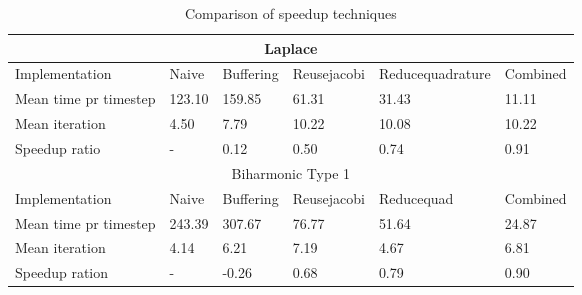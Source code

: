 \begin{table}[h!]
\centering
\caption{Comparison of speedup techniques}
\label{my-label}
\begin{tabular}{ |p{2.8cm}|p{2.2cm}|p{2.4cm}|p{2.4cm}|p{2.4cm}|p{2.4cm}| }
 \hline
  \multicolumn{6}{|c|}{Laplace} \\
 \hline
Implementation & Naive&Buffering&Reusejacobi&Reducequadrature&Combined \\
\hline
 Mean time pr timestep &123.10  & 159.85  & 61.31  & 31.43  & 11.11  \\
\hline
Mean iteration &4.50  & 7.79  & 10.22  & 10.08  & 10.22  \\
\hline
Speedup ratio& -  & 0.12  & 0.50  & 0.74  & 0.91  \\
  \hline
  \multicolumn{6}{|c|}{Biharmonic Type 1} \\
 \hline
Implementation & Naive & Buffering & Reusejacobi & Reducequad &Combined \\
\hline
 Mean time pr timestep &243.39  & 307.67  & 76.77  & 51.64  & 24.87  \\
\hline
Mean iteration &4.14  & 6.21  & 7.19  & 4.67  & 6.81  \\
\hline
Speedup ration& -  & -0.26  & 0.68  & 0.79  & 0.90  \\
\hline
\end{tabular}
\end{table}

